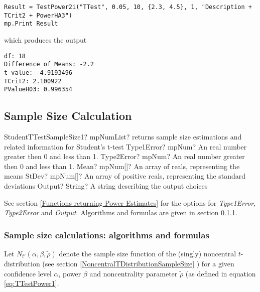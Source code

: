 \begin{lstlisting}
Result = TestPower2i("TTest", 0.05, 10, {2.3, 4.5}, 1, "Description + TCrit2 + PowerHA3")
mp.Print Result
\end{lstlisting}
which produces the output

\begin{verbatim}
df: 18
Difference of Means: -2.2
t-value: -4.9193496
TCrit2: 2.100922
PValueH03: 0.996354
\end{verbatim}





\subsection{Sample Size Calculation}


\begin{mpFunctionsExtract}
	\mpFunctionFiveNotImplemented
	{StudentTTestSampleSize1? mpNumList? returns sample size estimations and related information for Student's t-test}
	{Type1Error? mpNum? An real number greater then 0 and less than 1.}
	{Type2Error? mpNum? An real number greater then 0 and less than 1.}
	{Mean? mpNum[]? An array of reals, representing the means}
	{StDev? mpNum[]? An array of positive reals, representing the standard deviations}
	{Output? String? A string describing the output choices}
\end{mpFunctionsExtract}

\vspace{0.3cm}
See section \ref{Functions returning Power Estimates} for the options for {\itshape\sffamily Type1Error},  {\itshape\sffamily Type2Error} and {\itshape\sffamily Output}. Algorithms and formulas are given in section \ref{1SampleTTest_SampleSize}.



\subsubsection{Sample size calculations: algorithms and formulas}
\label{1SampleTTest_SampleSize}
Let $N_{t'}\left(\alpha, \beta, \widetilde{\rho} \right)$ denote the sample size function of the (singly) noncentral $t$-distribution (see section \ref{NoncentralTDistributionSampleSize} ) for a given confidence level $\alpha$, power $\beta$ and noncentrality parameter $\widetilde{\rho}$ (as defined in equation \ref{eq:TTestPower1}. 


